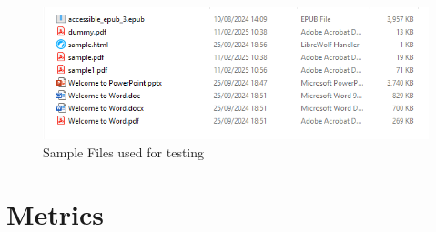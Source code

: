 \begin{figure}
    \centering
    \includegraphics[width=1\linewidth]{sample_files.png}
    \caption{Sample Files used for testing}
    \label{fig:sample_files}
\end{figure}



\section{Metrics}

